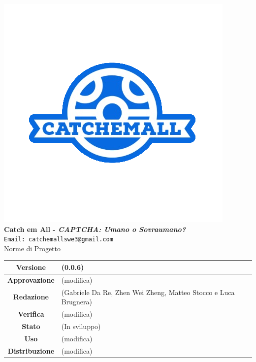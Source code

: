 \begin{titlepage}
\begin{center}
	\includegraphics[scale = 1.5]{img/logo.png}\\
	\bigskip
	\large \textbf{Catch em All - \textit{CAPTCHA: Umano o Sovraumano?}}\\
	\texttt{Email: catchemallswe3@gmail.com}\\
	\vfill
	{\fontsize{1.5cm}{0}\selectfont Norme di Progetto}\\
	\vfill
	\renewcommand\tabularxcolumn[1]{>{\Centering}m{#1}}
	\begin{tabularx}{\textwidth}{|c|X|}
		\hline
		\textbf{Versione} & (0.0.6)\\
		\hline
		\textbf{Approvazione} & (modifica)\\
		\hline
		\textbf{Redazione} & (Gabriele Da Re, Zhen Wei Zheng, Matteo Stocco e Luca Brugnera)\\
		\hline
		\textbf{Verifica} & (modifica)\\
		\hline
		\textbf{Stato} & (In sviluppo)\\
		\hline
		\textbf{Uso} & (modifica)\\
		\hline
		\textbf{Distribuzione} & (modifica)\\
		\hline
	\end{tabularx}
\end{center}
\end{titlepage}